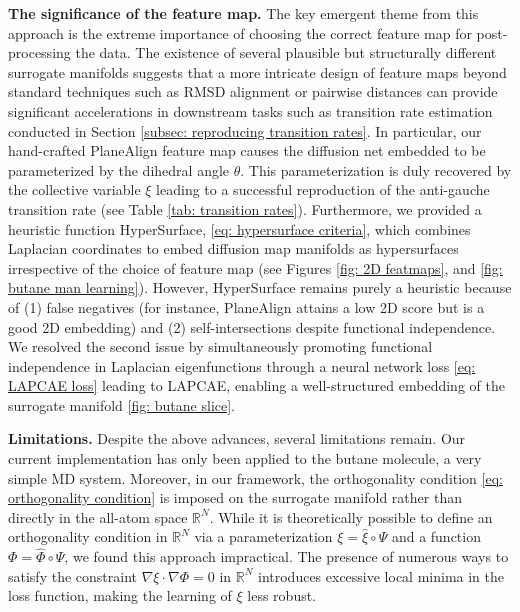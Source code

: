 \documentclass[reqno, 12pt]{article}
\begin{document}
{\bf The significance of the feature map.} The key emergent theme from this approach is the extreme importance of choosing the correct feature map for post-processing the data. The existence of several plausible but structurally different surrogate manifolds suggests that a more intricate design of feature maps beyond standard techniques such as RMSD alignment or pairwise distances can provide significant accelerations in downstream tasks such as transition rate estimation conducted in Section \eqref{subsec: reproducing transition rates}. In particular, our hand-crafted {\sf PlaneAlign} feature map causes the diffusion net embedded to be parameterized by the dihedral angle $\theta$. This parameterization is duly recovered by the collective variable $\xi$ leading to a successful reproduction of the anti-gauche transition rate (see Table \eqref{tab: transition rates}). Furthermore, we provided a heuristic function {\sf HyperSurface}, \eqref{eq: hypersurface criteria}, which combines Laplacian coordinates to embed diffusion map manifolds as hypersurfaces irrespective of the choice of feature map (see Figures \eqref{fig: 2D featmaps}, and \eqref{fig: butane man learning}). However, {\sf HyperSurface} remains purely a heuristic because of (1) false negatives (for instance, {\sf PlaneAlign} attains a low 2D score but is a good 2D embedding) and (2) self-intersections despite functional independence. We resolved the second issue by simultaneously promoting functional independence in Laplacian eigenfunctions through a neural network loss \eqref{eq: LAPCAE loss} leading to LAPCAE, enabling a well-structured embedding of the surrogate manifold \eqref{fig: butane slice}.

{\bf Limitations.} Despite the above advances, several limitations remain. Our current implementation has only been applied to the butane molecule, a very simple MD system. Moreover, in our framework, the orthogonality condition \eqref{eq: orthogonality condition} is imposed on the surrogate manifold rather than directly in the all-atom space \( \mathbb{R}^{N} \).  While it is theoretically possible to define an orthogonality condition in \( \mathbb{R}^{N} \) via a parameterization \( \xi = \widehat{\xi} \circ \Psi \) and a function \( \Phi = \widehat{\Phi} \circ \Psi \), we found this approach impractical. The presence of numerous ways to satisfy the constraint \( \nabla \xi \cdot \nabla \Phi = 0 \) in \( \mathbb{R}^{N} \) introduces excessive local minima in the loss function, making the learning of \( \xi \) less robust.
\end{document}
